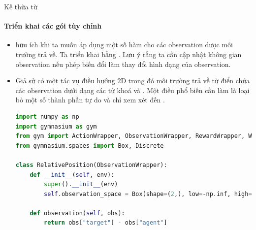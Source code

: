 \documentclass[10pt,aspectratio=169]{beamer}
\begin{document}
\begin{frame}[fragile]{Kế thừa từ }
\framesubtitle{Triển khai các gói tùy chỉnh}
\begin{itemize}
\setlength\itemsep{4pt}
\footnotesize
\item {} hữu ích khi ta muốn áp dụng một số hàm cho các observation dược môi trường trả về. Ta triển khai  bằng . Lưu ý rằng ta cần cập nhật không gian observation nếu phép biến đổi làm thay đổi hình dạng của observation.
\item Giả sử có một tác vụ điều hướng 2D trong đó môi trường trả về từ điển chứa các observation dưới dạng các từ khoá  và . Một điều phổ biến cần làm là loại bỏ một số thành phần tự do và chỉ xem xét đến .\\
\scriptsize
\begin{lstlisting}[language=Python]
import numpy as np
import gymnasium as gym
from gym import ActionWrapper, ObservationWrapper, RewardWrapper, Wrapper
from gymnasium.spaces import Box, Discrete

class RelativePosition(ObservationWrapper):
    def __init__(self, env):
        super().__init__(env)
        self.observation_space = Box(shape=(2,), low=-np.inf, high=np.inf)

    def observation(self, obs):
        return obs["target"] - obs["agent"]
\end{lstlisting}
\end{itemize}
\end{frame}
\end{document}
